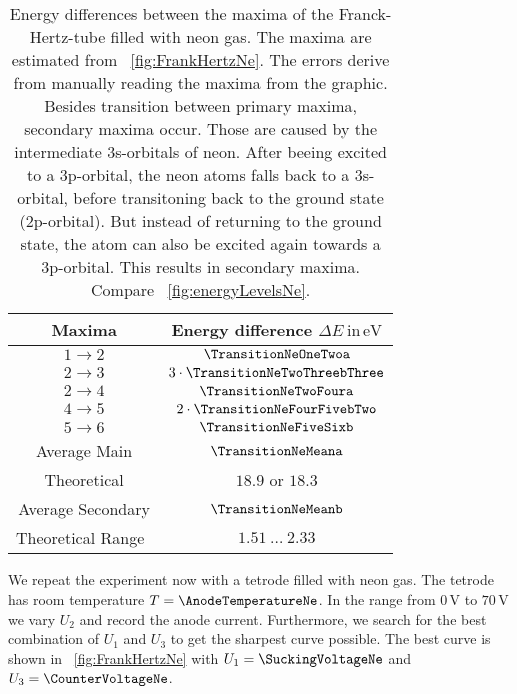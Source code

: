 \documentclass[a4paper,10pt,twocolumn]{article}
\newcommand{\volt}{\, \mathrm{V}}
\newcommand{\eV}{\, \mathrm{eV}}
\newcommand{\TheoreticalTransitionNea}{18.9}
\newcommand{\TheoreticalTransitionNeaa}{18.3}
\newcommand{\TheoreticalTransitionNeb}{1.51 \ \dots \ 2.33}
\begin{document}
    \begin{table}[httb]
        \centering
        \begin{tabular}{c c}
            \hline \hline
            Maxima & Energy difference $\Delta E \ \mathrm{in} \eV$ \\
            \hline
            $1 \rightarrow 2$ & $\TransitionNeOneTwoa$ \\
            $2 \rightarrow 3$ & $3 \cdot \TransitionNeTwoThreebThree$ \\
            $2 \rightarrow 4$ & $\TransitionNeTwoFoura$ \\
            $4 \rightarrow 5$ & $2 \cdot \TransitionNeFourFivebTwo$ \\
            $5 \rightarrow 6$ & $\TransitionNeFiveSixb$ \\
            \hline
            Average Main & $\TransitionNeMeana$\\
            Theoretical & $\TheoreticalTransitionNea$ or $\TheoreticalTransitionNeaa$ \\
            Average Secondary & $\TransitionNeMeanb$ \\
            Theoretical Range~\cite{neonSpectrum} & $\TheoreticalTransitionNeb$ \\
            \hline
            \hline
        \end{tabular}
        \caption{Energy differences between the maxima of the Franck-Hertz-tube filled with neon gas.
        The maxima are estimated from ~\autoref{fig:FrankHertzNe}.
        The errors derive from manually reading the maxima from the graphic.
        Besides transition between primary maxima, secondary maxima occur.
        Those are caused by the intermediate 3s-orbitals of neon.
        After beeing excited to a 3p-orbital, the neon atoms falls back to a 3s-orbital, before 
        transitoning back to the ground state (2p-orbital).
        But instead of returning to the ground state, the atom can also be excited again towards a 3p-orbital.
        This results in secondary maxima.
        Compare ~\autoref{fig:energyLevelsNe}.
        }
        \label{tab:transitionNe}
    \end{table}

    We repeat the experiment now with a tetrode filled with neon gas.
    The tetrode has room temperature $T = \AnodeTemperatureNe$.
    In the range from $0\volt$ to $70\volt$ we vary $U_2$ and record the anode current.
    Furthermore, we search for the best combination of $U_1$ and $U_3$ to get the sharpest curve possible.
    The best curve is shown in ~\autoref{fig:FrankHertzNe} with $U_1 = \SuckingVoltageNe$ and $U_3 = \CounterVoltageNe$.
    
\end{document}
